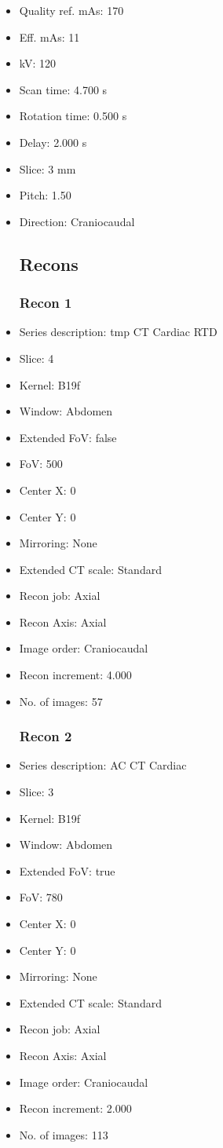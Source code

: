 \documentclass[12pt]{article}
\begin{document}
\begin{itemize}
\subsection{Scan}
\item Quality ref. mAs: 170\item Eff. mAs: 11\item kV: 120\item Scan time: 4.700 s\item Rotation time: 0.500 s\item Delay: 2.000 s\item Slice: 3 mm\item Pitch: 1.50\item Direction: Craniocaudal\subsection{Recons}

\subsubsection{Recon 1}
\item Series description: tmp CT Cardiac RTD
\item Slice: 4
\item Kernel: B19f
\item Window: Abdomen
\item Extended FoV: false
\item FoV: 500
\item Center X: 0
\item Center Y: 0
\item Mirroring: None
\item Extended CT scale: Standard
\item Recon job: Axial
\item Recon Axis: Axial
\item Image order: Craniocaudal
\item Recon increment: 4.000
\item No. of images: 57
\subsubsection{Recon 2}
\item Series description: AC CT Cardiac
\item Slice: 3
\item Kernel: B19f
\item Window: Abdomen
\item Extended FoV: true
\item FoV: 780
\item Center X: 0
\item Center Y: 0
\item Mirroring: None
\item Extended CT scale: Standard
\item Recon job: Axial
\item Recon Axis: Axial
\item Image order: Craniocaudal
\item Recon increment: 2.000
\item No. of images: 113

\end{itemize}
\end{document}
